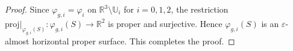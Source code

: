 \documentclass[10pt,a4paper]{amsart}
\def\uu{\mathbb{U}}
\begin{document}
\begin{proof}
Since $\varphi_{g,i}=\varphi_i$ on $\mathbb{R}^3\setminus \uu_i$ for $i=0,1,2$, 
the restriction 
$\mathrm{proj}|_{\varphi_{g,i}(S)}:\varphi_{g,i}(S)\longrightarrow \mathbb{R}^2$ is proper and surjective.
Hence $\varphi_{g,i}(S)$ is an $\varepsilon$-almost horizontal proper surface.
This completes the proof.
\end{proof}
\end{document}
